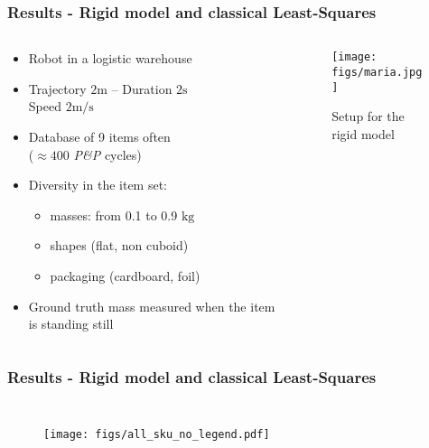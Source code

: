 \documentclass[aspectratio=1610]{beamer}
\begin{document}
\begin{frame}
\frametitle{Results - Rigid model and classical Least-Squares}
\begin{columns}
\begin{column}{0.5\textwidth}
  \begin{itemize}\itemsep1em
    \justifying
    \item Robot in a logistic warehouse
    \item \textcolor{Ocean}{Trajectory} $2 \si{\meter}$ – \textcolor{Ocean}{Duration} $2 \si{\second}$ \\
    \textcolor{Ocean}{Speed} $2 \si{\meter\per\second}$
    \item Database of 9 items often  \\
     ($\approx 400$ \textit{P\&P} cycles)
    \item Diversity in the item set:
    \begin{itemize}
      \item masses: from 0.1 to 0.9 $\si{\kilo\gram}$
      \item shapes (flat, non cuboid)
      \item packaging (cardboard, foil)
    \end{itemize}
    \item Ground truth mass measured when the item is standing still
  \end{itemize}
\end{column}
\begin{column}{0.5\textwidth}  %
  \begin{figure}
    \centering
    \texttt{[image: figs/maria.jpg]}
    \caption{Setup for the rigid model}
  \end{figure}
\end{column}
\end{columns}

\end{frame}

\begin{frame}
\frametitle{Results - Rigid model and classical Least-Squares}
\begin{columns}
  \column{37em}
  \begin{figure}
    \centering
    \texttt{[image: figs/all\_sku\_no\_legend.pdf]}
  \end{figure}
\end{columns}
\end{frame}
\end{document}
